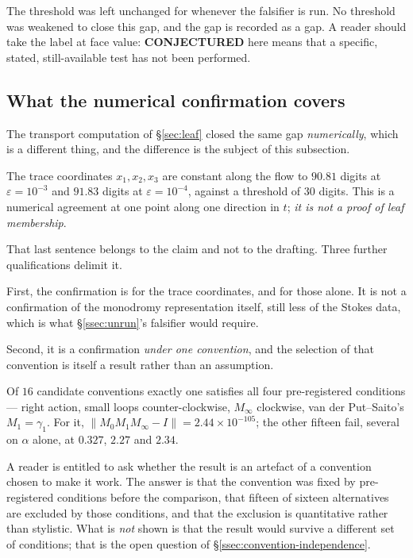 The threshold was left unchanged for whenever the falsifier is run. No
threshold was weakened to close this gap, and the gap is recorded as a gap. A
reader should take the label at face value: \textbf{CONJECTURED} here means
that a specific, stated, still-available test has not been performed.

\subsection{What the numerical confirmation covers}\label{ssec:numerical-scope}

The transport computation of \S\ref{sec:leaf} closed the same gap
\emph{numerically}, which is a different thing, and the difference is the
subject of this subsection.

\begin{remark}
The trace coordinates $x_1,x_2,x_3$ are constant along the flow to $90.81$
digits at $\varepsilon=10^{-3}$ and $91.83$ digits at $\varepsilon=10^{-4}$,
against a threshold of $30$ digits. This is a numerical agreement at one point
along one direction in $t$; \emph{it is not a proof of leaf membership}.
\end{remark}

That last sentence belongs to the claim and not to the drafting. Three further
qualifications delimit it.

First, the confirmation is for the trace coordinates, and for those alone. It
is not a confirmation of the monodromy representation itself, still less of the
Stokes data, which is what \S\ref{ssec:unrun}'s falsifier would require.

Second, it is a confirmation \emph{under one convention}, and the selection of
that convention is itself a result rather than an assumption.

\begin{remark}
Of $16$ candidate conventions exactly one satisfies all four pre-registered
conditions --- right action, small loops counter-clockwise, $M_\infty$
clockwise, van der Put--Saito's $M_1=\gamma_1$. For it,
$\lVert M_0M_1M_\infty-I\rVert=2.44\times10^{-105}$; the other fifteen fail,
several on $\alpha$ alone, at $0.327$, $2.27$ and $2.34$.
\end{remark}

A reader is entitled to ask whether the result is an artefact of a convention
chosen to make it work. The answer is that the convention was fixed by
pre-registered conditions before the comparison, that fifteen of sixteen
alternatives are excluded by those conditions, and that the exclusion is
quantitative rather than stylistic. What is \emph{not} shown is that the result
would survive a different set of conditions; that is the open question of
\S\ref{ssec:convention-independence}.

